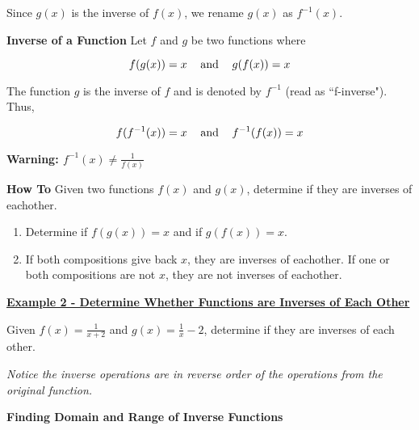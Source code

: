 \documentclass[12pt]{book}
\newcommand{\D}{\displaystyle}
\begin{document}
Since $g(x)$ is the inverse of $f(x)$, we rename $g(x)$ as $f^{-1}(x)$.

\begin{boxR}
    \textbf{Inverse of a Function}
    \vspace{1mm}
    \hline 
    \vspace{2mm}
    Let $f$ and $g$ be two functions where 

    $$ f(g(x)) = x  \hspace{3mm }\text{ and }\hspace{3mm} g(f(x))=x$$

    The function $g$ is the inverse of $f$ and is denoted by $f^{-1}$ (read as ``f-inverse"). Thus, 

    $$   f(f^{-1}(x)) = x  \hspace{3mm }\text{ and }\hspace{3mm} f^{-1}(f(x))=x $$

    \textbf{\textcolor{BrickRed}{Warning: $\D f^{-1}(x) \neq \frac{1}{f(x)}$}}
\end{boxR}


\newpage

\begin{boxR}
   \textbf{ How To}
   \vspace{1mm}
   \hline
   \vspace{2mm}
   Given two functions $f(x)$ and $g(x)$, determine if they are inverses of eachother.
   \begin{enumerate}
       \item Determine if $f(g(x))=x$ and if $g(f(x))=x$.
       \item If both compositions give back $x$, they are inverses of eachother. If one or both compositions are not $x$, they are not inverses of eachother.
   \end{enumerate}
\end{boxR}

\underline{\textbf{Example 2 - Determine Whether Functions are Inverses of Each Other}}
\vspace{1mm}

Given $\D f(x) = \frac{1}{x+2}$ and $\D g(x)=\frac{1}{x}-2$, determine if they are inverses of each other. 

\vspace{150mm}
\textcolor{BrickRed}{\textit{Notice the inverse operations are in reverse order of the operations from the original function.}}

\newpage
{\large \textbf{Finding Domain and Range of Inverse Functions}}
\end{document}
